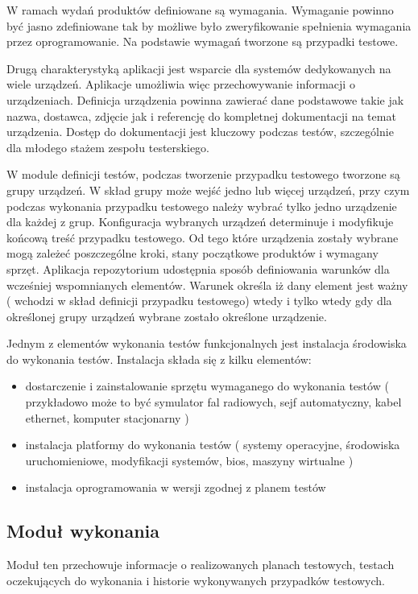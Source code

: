 W ramach wydań produktów definiowane są wymagania. Wymaganie powinno być jasno zdefiniowane tak by możliwe było zweryfikowanie spełnienia wymagania przez oprogramowanie. Na podstawie wymagań tworzone są przypadki testowe.

Drugą charakterystyką aplikacji jest wsparcie dla systemów dedykowanych na wiele urządzeń. Aplikacje umożliwia więc przechowywanie informacji o urządzeniach. Definicja urządzenia powinna zawierać dane podstawowe takie jak nazwa, dostawca, zdjęcie jak i referencję do kompletnej dokumentacji na temat urządzenia. Dostęp do dokumentacji jest kluczowy podczas testów, szczególnie dla młodego stażem zespołu testerskiego.

W module definicji testów, podczas tworzenie przypadku testowego tworzone są grupy urządzeń. W skład grupy może wejść jedno lub więcej urządzeń, przy czym podczas wykonania przypadku testowego należy wybrać tylko jedno urządzenie dla każdej z grup. Konfiguracja wybranych urządzeń determinuje i modyfikuje końcową treść przypadku testowego. Od tego które urządzenia zostały wybrane mogą zależeć poszczególne kroki, stany początkowe produktów i wymagany sprzęt. Aplikacja repozytorium udostępnia sposób definiowania warunków dla wcześniej wspomnianych elementów. Warunek określa iż dany element jest ważny ( wchodzi w skład definicji przypadku testowego) wtedy i tylko wtedy gdy dla określonej grupy urządzeń wybrane zostało określone urządzenie.

Jednym z elementów wykonania testów funkcjonalnych jest instalacja środowiska do wykonania testów. Instalacja składa się z kilku elementów:
\begin{itemize}
  \item dostarczenie i zainstalowanie sprzętu wymaganego do wykonania testów ( przykładowo może to być symulator fal radiowych, sejf automatyczny, kabel ethernet, komputer stacjonarny )
  \item instalacja platformy do wykonania testów ( systemy operacyjne, środowiska uruchomieniowe, modyfikacji systemów, bios, maszyny wirtualne )
  \item instalacja oprogramowania w wersji zgodnej z planem testów
\end{itemize}

\subsection{Moduł wykonania }

Moduł ten przechowuje informacje o realizowanych planach testowych, testach oczekujących do wykonania i historie wykonywanych przypadków testowych.

